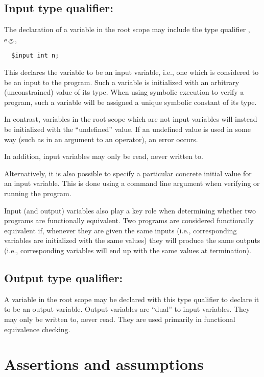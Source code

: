 \subsection{Input type qualifier: \cinput}

The declaration of a variable in the root scope may
include the type qualifier \cinput, e.g.,
\begin{verbatim}
  $input int n;
\end{verbatim}
This declares the variable to be an input variable, i.e., one which is
considered to be an input to the program.  Such a variable is
initialized with an arbitrary (unconstrained) value of its type.  When
using symbolic execution to verify a program, such a variable will be
assigned a unique symbolic constant of its type.

In contrast, variables in the root scope which are not input variables
will instead be initialized with the ``undefined'' value.  If an
undefined value is used in some way (such as in an argument to an
operator), an error occurs.

In addition, input variables may only be read, never written to.

Alternatively, it is also possible to specify a particular concrete
initial value for an input variable.  This is done using a command
line argument when verifying or running the program.

Input (and output) variables also play a key role when determining
whether two programs are functionally equivalent.  Two programs are
considered functionally equivalent if, whenever they are given the
same inputs (i.e., corresponding \cinput{} variables are initialized
with the same values) they will produce the same outputs (i.e.,
corresponding \coutput{} variables will end up with the same values at
termination).

\subsection{Output type qualifier: \coutput}

A variable in the root scope may be declared with this type qualifier
to declare it to be an output variable.  Output variables are ``dual''
to input variables.  They may only be written to, never read.  They
are used primarily in functional equivalence checking.

\section{Assertions and assumptions}

